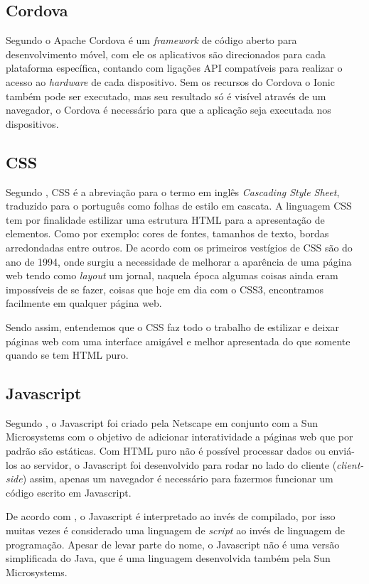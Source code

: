 	\subsection{Cordova}
		\par Segundo  o Apache Cordova é um \textit{framework} de código aberto para desenvolvimento móvel, com ele os aplicativos são direcionados para cada plataforma específica, contando com ligações API compatíveis para realizar o acesso ao \textit{hardware} de cada dispositivo. Sem os recursos do Cordova o Ionic também pode ser executado, mas seu resultado só é visível através de um navegador, o Cordova é necessário para que a aplicação seja executada nos dispositivos.
	\subsection{CSS}
		\par Segundo , CSS é a abreviação para o termo em inglês \textit{Cascading Style Sheet}, traduzido para o
		português como folhas de estilo em cascata. A linguagem CSS tem por finalidade estilizar uma estrutura HTML para a apresentação de elementos. Como por exemplo: cores de fontes, tamanhos de texto, bordas arredondadas entre outros. De acordo com  os primeiros vestígios de CSS são do ano de 1994, onde surgiu a necessidade de melhorar a aparência de uma página web tendo como \textit{layout} um jornal, naquela época algumas coisas ainda eram impossíveis de se fazer, coisas que hoje em dia com o CSS3, encontramos facilmente em qualquer página web.
		\par Sendo assim, entendemos que o CSS faz todo o trabalho de estilizar e deixar páginas web com uma interface amigável e melhor apresentada do que somente quando se tem HTML puro.
		
	\subsection{Javascript}
		\par Segundo , o Javascript foi criado pela Netscape em conjunto com a Sun Microsystems com o objetivo de adicionar interatividade a páginas web que por padrão são estáticas. Com HTML puro não é possível processar dados ou enviá-los ao servidor, o Javascript foi desenvolvido para rodar no lado do cliente (\textit{client-side}) assim, apenas um navegador é necessário para fazermos funcionar um código escrito em Javascript.
		\par De acordo com , o Javascript é interpretado ao invés de compilado, por isso muitas vezes é considerado uma linguagem de \textit{script} ao invés de linguagem de programação. Apesar de levar parte do nome, o Javascript não é uma versão simplificada do Java, que é uma linguagem desenvolvida também pela Sun Microsystems.
		
